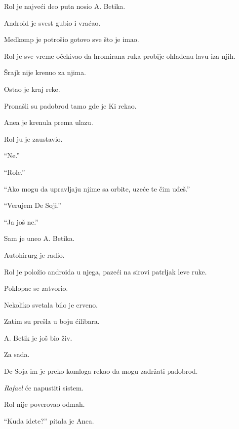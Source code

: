 Rol je najveći deo puta nosio A. Betika.

\bigskip

Android je svest gubio i vraćao.

Medkomp je potrošio gotovo sve što je imao.

\bigskip

Rol je sve vreme očekivao da hromirana ruka probije ohlađenu lavu iza njih.

\bigskip

Šrajk nije krenuo za njima.

Ostao je kraj reke.

\bigskip

Pronašli su padobrod tamo gde je Ki rekao.

\bigskip

Anea je krenula prema ulazu.

Rol ju je zaustavio.

``Ne.''

``Role.''

``Ako mogu da upravljaju njime sa orbite, uzeće te čim uđeš.''

``Verujem De Soji.''

``Ja još ne.''

\bigskip

Sam je uneo A. Betika.

\bigskip

Autohirurg je radio.

\bigskip

Rol je položio androida u njega, pazeći na sirovi patrljak leve ruke.

Poklopac se zatvorio.

\bigskip

Nekoliko svetala bilo je crveno.

Zatim su prešla u boju ćilibara.

\bigskip

A. Betik je još bio živ.

\bigskip

Za sada.

\bigskip

De Soja im je preko komloga rekao da mogu zadržati padobrod.

\emph{Rafael} će napustiti sistem.

\bigskip

Rol nije poverovao odmah.

``Kuda idete?'' pitala je Anea.

\bigskip

